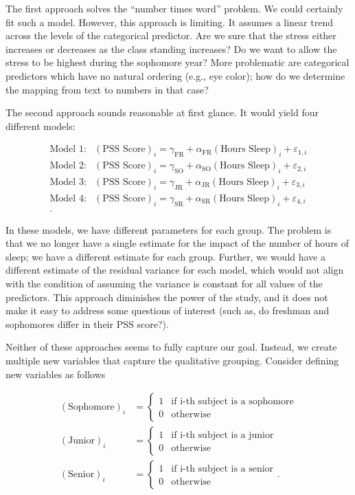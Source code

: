 \documentclass[
  letterpaper,
  DIV=11,
  numbers=noendperiod]{scrreprt}
\theoremstyle{definition}
\theoremstyle{definition}
\theoremstyle{remark}
\begin{document}
The first approach solves the ``number times word'' problem. We could
certainly fit such a model. However, this approach is limiting. It
assumes a linear trend across the levels of the categorical predictor.
Are we sure that the stress either increases or decreases as the class
standing increases? Do we want to allow the stress to be highest during
the sophomore year? More problematic are categorical predictors which
have no natural ordering (e.g., eye color); how do we determine the
mapping from text to numbers in that case?

The second approach sounds reasonable at first glance. It would yield
four different models:

\[
\begin{aligned}
  \text{Model 1}:& (\text{PSS Score})_i = \gamma_{\text{FR}} + 
    \alpha_{\text{FR}} (\text{Hours Sleep})_i + \varepsilon_{1,i} \\
  \text{Model 2}:& (\text{PSS Score})_i = \gamma_{\text{SO}} + 
    \alpha_{\text{SO}} (\text{Hours Sleep})_i + \varepsilon_{2,i} \\
  \text{Model 3}:& (\text{PSS Score})_i = \gamma_{\text{JR}} + 
    \alpha_{\text{JR}} (\text{Hours Sleep})_i + \varepsilon_{3,i} \\
  \text{Model 4}:& (\text{PSS Score})_i = \gamma_{\text{SR}} + 
    \alpha_{\text{SR}} (\text{Hours Sleep})_i + \varepsilon_{4,i} \\.
\end{aligned}
\]

In these models, we have different parameters for each group. The
problem is that we no longer have a single estimate for the impact of
the number of hours of sleep; we have a different estimate for each
group. Further, we would have a different estimate of the residual
variance for each model, which would not align with the condition of
assuming the variance is constant for all values of the predictors. This
approach diminishes the power of the study, and it does not make it easy
to address some questions of interest (such as, do freshman and
sophomores differ in their PSS score?).

Neither of these approaches seems to fully capture our goal. Instead, we
create multiple new variables that capture the qualitative grouping.
Consider defining new variables as follows

\[
\begin{aligned}
  (\text{Sophomore})_i &= \begin{cases}
    1 & \text{if i-th subject is a sophomore} \\
    0 & \text{otherwise}
    \end{cases} \\
  (\text{Junior})_i &= \begin{cases}
    1 & \text{if i-th subject is a junior} \\
    0 & \text{otherwise}
    \end{cases} \\
  (\text{Senior})_i &= \begin{cases}
    1 & \text{if i-th subject is a senior} \\
    0 & \text{otherwise}
    \end{cases}.
\end{aligned}
\]
\end{document}
